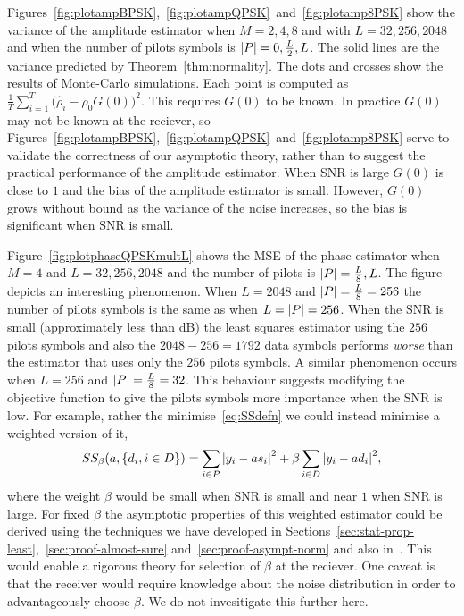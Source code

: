\documentclass[journal]{IEEEtran}
\begin{document}
Figures~\ref{fig:plotampBPSK},~\ref{fig:plotampQPSK}~and~\ref{fig:plotamp8PSK} show the variance of the amplitude estimator when $M=2,4,8$ and with $L=32, 256, 2048$ and when the number of pilots symbols is ${\left\vert P \right\vert} = 0, \tfrac{L}{2}, L$.  The solid lines are the variance predicted by Theorem~\ref{thm:normality}.  The dots and crosses show the results of Monte-Carlo simulations.  Each point is computed as $\tfrac{1}{T}\sum_{i=1}^T\big(\hat{\rho}_i - \rho_0G(0)\big)^2$.  This requires $G(0)$ to be known.  In practice $G(0)$ may not be known at the reciever, so Figures~\ref{fig:plotampBPSK},~\ref{fig:plotampQPSK}~and~\ref{fig:plotamp8PSK} serve to validate the correctness of our asymptotic theory, rather than to suggest the practical performance of the amplitude estimator.  When SNR is large $G(0)$ is close to $1$ and the bias of the amplitude estimator is small.  However, $G(0)$ grows without bound as the variance of the noise increases, so the bias is significant when SNR is small.

Figure~\ref{fig:plotphaseQPSKmultL} shows the MSE of the phase estimator when $M=4$ and $L=32,256, 2048$ and the number of pilots is ${\left\vert P \right\vert}=\tfrac{L}{8},L$.  The figure depicts an interesting phenomenon.  When $L=2048$ and ${\left\vert P \right\vert} = \tfrac{L}{8} = 256$ the number of pilots symbols is the same as when $L={\left\vert P \right\vert} = 256$.  When the SNR is small (approximately less than \unit[0]{dB}) the least squares estimator using the $256$ pilots symbols and also the $2048-256=1792$ data symbols performs \emph{worse} than the estimator that uses only the $256$ pilots symbols.  A similar phenomenon occurs when $L=256$ and ${\left\vert P \right\vert} = \tfrac{L}{8} = 32$.  %
This behaviour suggests modifying the objective function to give the pilots symbols more importance when the SNR is low.  For example, rather the minimise~\eqref{eq:SSdefn} we could instead minimise a weighted version of it,
\[
SS_{\beta}(a, \{d_i, i \in D\}) = \sum_{i \in P} {\left\vert  y_i - a s_i  \right\vert}^2 + \beta \sum_{i \in D} {\left\vert  y_i - a d_i  \right\vert}^2,
\]
where the weight $\beta$ would be small when SNR is small and near $1$ when SNR is large.  For fixed $\beta$ the asymptotic properties of this weighted estimator could be derived using the techniques we have developed in Sections~\ref{sec:stat-prop-least},~\ref{sec:proof-almost-sure} and~\ref{sec:proof-asympt-norm} and also in~\cite{McKilliam_leastsqPSKpilotsdata_2012appendix}.  This would enable a rigorous theory for selection of $\beta$ at the reciever.  One caveat is that the receiver would require knowledge about the noise distribution in order to advantageously choose $\beta$.  We do not invesitigate this further here.
\end{document}
